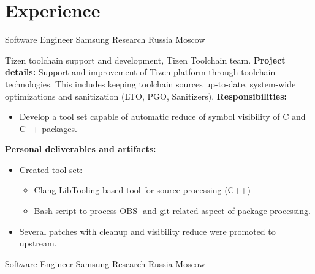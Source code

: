 \documentclass[11pt,a4paper]{moderncv}
\begin{document}
\section{Experience}
\label{sec:exp}
 {Software Engineer} {Samsung Research Russia} {Moscow} {}
        {Tizen toolchain support and development, Tizen Toolchain team.\newline{}
          \textbf{Project details:}\newline{}
          Support and improvement of Tizen platform through toolchain technologies. This includes keeping toolchain sources up-to-date, system-wide optimizations and sanitization (LTO, PGO, Sanitizers).\newline{}
          \textbf{Responsibilities:}
          \begin{itemize}
          \item Develop a tool set capable of automatic reduce of symbol visibility of C and C++ packages.
          \end{itemize}
\textbf{Personal deliverables and artifacts:}
\begin{itemize}
\item Created tool set:
\begin{itemize}
\item Clang LibTooling based tool for source processing (C++)
\item Bash script to process OBS- and git-related aspect of package processing.
  \end{itemize}
\item Several patches with cleanup and visibility reduce were promoted to upstream.
  \end{itemize}
        }
 {Software Engineer} {Samsung Research Russia} {Moscow} {}
\end{document}
